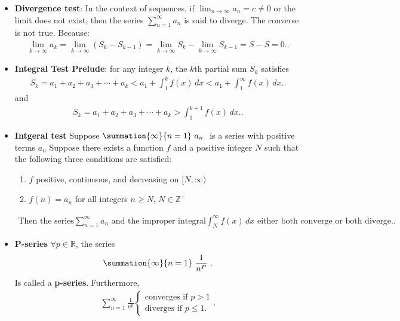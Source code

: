 \documentclass{report}
\begin{document}
\begin{itemize}
    \item \textbf{Divergence test}: In the context of sequences, if $\lim_{{n \to \infty}} a_n = c \neq 0$ or the limit does not exist, then the series $\sum_{{n=1}}^{\infty} a_n$ is said to diverge. The converse is not true.
        \bigbreak \noindent 
        Because:
        \begin{align*}
            \lim_{k \to \infty} a_k = \lim_{k \to \infty} (S_k - S_{k-1}) = \lim_{k \to \infty} S_k - \lim_{k \to \infty} S_{k-1} = S - S = 0.
        .\end{align*}
    \item \textbf{Integral Test Prelude}:
        for any integer $k$, the $k$th partial sum $S_k$ satisfies
        \begin{align*}
            S_k = a_1 + a_2 + a_3 + \cdots + a_k < a_1 + \int_{1}^{k} f(x) \, dx < a_1 + \int_{1}^{\infty} f(x) \, dx.
        .\end{align*}
        and
        \begin{align*}
            S_k = a_1 + a_2 + a_3 + \cdots + a_k > \int_{1}^{k+1} f(x) \, dx.
        .\end{align*}

    \item \textbf{Intgeral test}
        Suppose  $\summation{\infty}{n=1}\ a_{n}\  $ is a series with positive terms  $a_{n}$ Suppose there exists a function  $f $
        and a positive integer  $N$ 
        such that the following three conditions are satisfied:
        \begin{enumerate}
            \item \( f \) positive, continuous, and decreasing on $[N,\infty)$
            \item \( f(n) = a_n \) for all integers \( n \geq N \), $N \in \mathbb{Z^{+}} $
        \end{enumerate}
        \begin{align*}
            \text{Then the series} \sum_{n=1}^{\infty} a_n \text{ and the improper integral} \int_{N}^{\infty} f(x) \, dx \text{ either both converge or both diverge.}
        .\end{align*}

    \item \textbf{P-series}
        $\forall p \in \mathbb{R}$, the series 
        \begin{align*}
            \summation{\infty}{n=1}\ \frac{1}{n^{P}}\ 
        .\end{align*}
        Is called a \textbf{p-series}. Furthermore, 
        \begin{align*}
            \sum_{n=1}^{\infty} \frac{1}{n^p} \begin{cases}
                \text{converges if } p>1 \\
                \text{diverges if } p \leq 1.
            \end{cases}
        .\end{align*}


\end{itemize}
\end{document}
